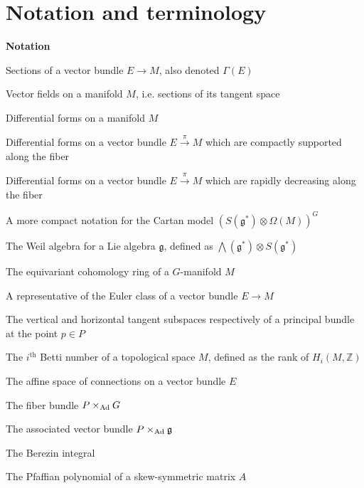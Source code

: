 

\chapter{Notation and terminology}\label{notation}

\renewcommand{\thefootnote}{\fnsymbol{footnote}}


\noindent\textbf{Notation}


\newcommand{\nttn}[2]{\item[{\ \parbox{3.18cm}{#1}}]{#2}}
\begin{list}{}{ \setlength{\leftmargin}{3.4cm}
                \setlength{\labelwidth}{3.4cm}}

\nttn{$\Gamma(M,E)$}{Sections of a vector bundle $E\to M$, also denoted $\Gamma(E)$}

\nttn{$\mathcal{X}(M)$}{Vector fields on a manifold $M$, i.e. sections of its
tangent space}

\nttn{$\Omega(M)$}{Differential forms on a manifold $M$}

\nttn{$\Omega_{cv}(E)$}{Differential forms on a vector bundle
	$E\xrightarrow{\pi} M$ which are compactly supported along the fiber}

\nttn{$\Omega_{rd}(E)$}{Differential forms on a vector bundle
	$E\xrightarrow{\pi} M$ which are rapidly decreasing along the fiber}

\nttn{$\Omega_G(M)$}{A more compact notation for the Cartan model
$(S(\mathfrak{g}^*)\otimes \Omega(M))^G$}

\nttn{$W(\mathfrak{g})$}{The Weil algebra for a Lie algebra $\mathfrak{g}$,
defined as $\bigwedge (\mathfrak{g}^*) \otimes S(\mathfrak{g}^*)$}

\nttn{$H_G(M)$}{The equivariant cohomology ring of a $G$-manifold  $M$}

\nttn{$\chi(E\to M)$ \\or $\chi(E)$}{A representative of the Euler class of a vector bundle
$E\to M$}

\nttn{$V_pP,H_pP$}{The vertical and horizontal tangent subspaces respectively 
	of a principal bundle at the point $p\in P$}

\nttn{$b_i$}{The $i^{\text{th}}$ Betti number of a topological space $M$, defined as
the rank of $H_i(M,\mathbb{Z})$}

\nttn{$\mathcal{A}(E)$}{The affine space of connections on a vector bundle $E$}

\nttn{$\Ad P$}{The fiber bundle $P\times_{\operatorname{Ad}} G$}

\nttn{$\ad(P)$}{The associated vector bundle $P\times_{\operatorname{Ad}}\operatorname{\mathfrak{g}}$}

\nttn{$\int^B$}{The Berezin integral}


\nttn{$\Pf(A)$}{The Pfaffian polynomial of a skew-symmetric matrix $A$}

\end{list}

